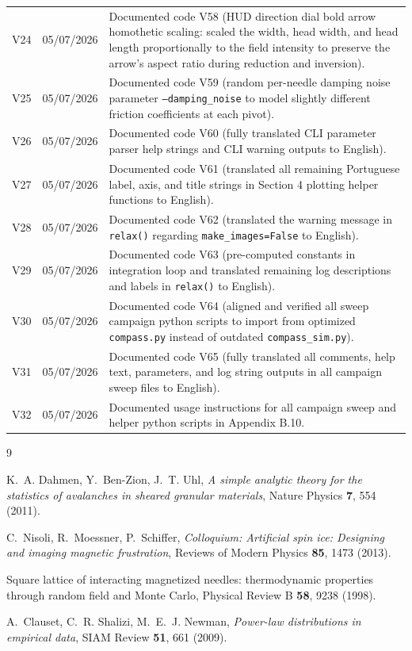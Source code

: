 \documentclass[11pt,a4paper]{article}
\newcommand{\code}[1]{\texttt{#1}}
\begin{document}
\begin{tabular}{@{}lll@{}}
V24 & 05/07/2026 & Documented code V58 (HUD direction dial bold arrow homothetic scaling: scaled the width, head width, and head length proportionally to the field intensity to preserve the arrow's aspect ratio during reduction and inversion). \\
V25 & 05/07/2026 & Documented code V59 (random per-needle damping noise parameter \code{--damping\_noise} to model slightly different friction coefficients at each pivot). \\
V26 & 05/07/2026 & Documented code V60 (fully translated CLI parameter parser help strings and CLI warning outputs to English). \\
V27 & 05/07/2026 & Documented code V61 (translated all remaining Portuguese label, axis, and title strings in Section 4 plotting helper functions to English). \\
V28 & 05/07/2026 & Documented code V62 (translated the warning message in \code{relax()} regarding \code{make\_images=False} to English). \\
V29 & 05/07/2026 & Documented code V63 (pre-computed constants in integration loop and translated remaining log descriptions and labels in \code{relax()} to English). \\
V30 & 05/07/2026 & Documented code V64 (aligned and verified all sweep campaign python scripts to import from optimized \code{compass.py} instead of outdated \code{compass\_sim.py}). \\
V31 & 05/07/2026 & Documented code V65 (fully translated all comments, help text, parameters, and log string outputs in all campaign sweep files to English). \\
V32 & 05/07/2026 & Documented usage instructions for all campaign sweep and helper python scripts in Appendix B.10. \\
\bottomrule
\end{tabular}

\begin{thebibliography}{9}

K.~A. Dahmen, Y.~Ben-Zion, J.~T. Uhl,
\emph{A simple analytic theory for the statistics of avalanches in
sheared granular materials},
Nature Physics \textbf{7}, 554 (2011).

C.~Nisoli, R.~Moessner, P.~Schiffer,
\emph{Colloquium: Artificial spin ice: Designing and imaging magnetic
frustration},
Reviews of Modern Physics \textbf{85}, 1473 (2013).

Square lattice of interacting magnetized needles: thermodynamic
properties through random field and Monte Carlo,
Physical Review B \textbf{58}, 9238 (1998).

A.~Clauset, C.~R. Shalizi, M.~E.~J. Newman,
\emph{Power-law distributions in empirical data},
SIAM Review \textbf{51}, 661 (2009).

\end{thebibliography}
\end{document}
